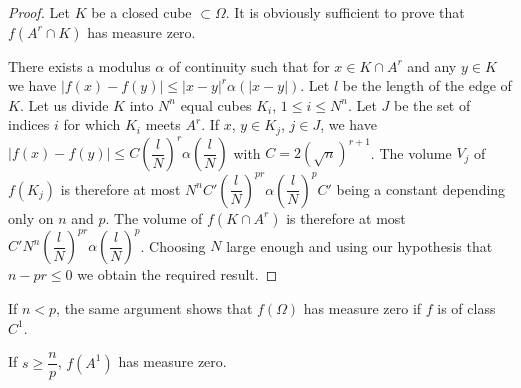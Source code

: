 \begin{proof}
Let $K$ be a closed cube $\subset \Omega$. It is obviously sufficient to prove that $f(A^{r}\cap K)$ has measure zero.

There exists a modulus $\alpha$ of continuity such that for $x\in K\cap A^{r}$ and any $y\in K$ we have $|f(x)-f(y)|\leq |x-y|^{r}\alpha(|x-y|)$. Let $l$ be the length of the edge of $K$. Let us divide $K$ into $N^{n}$ equal cubes $K_{i}$, $1\leq i\leq N^{n}$. Let $J$ be the set of indices $i$ for which $K_{i}$ meets $A^{r}$. If $x$, $y\in K_{j}$, $j\in J$, we have $|f(x)-f(y)|\leq C\left(\dfrac{l}{N}\right)^{r}\alpha\left(\dfrac{l}{N}\right)$ with $C=2(\surd n)^{r+1}$. The volume $V_{j}$ of $f(K_{j})$ is therefore at most $N^{n}C'\left(\dfrac{l}{N}\right)^{pr}\alpha \left(\dfrac{l}{N}\right)^{p}C'$ being a constant depending only on $n$ and $p$. The volume of $f(K\cap A^{r})$ is therefore at most $C'N^{n}\left(\dfrac{l}{N}\right)^{pr}\alpha\left(\dfrac{l}{N}\right)^{p}$. Choosing $N$ large enough and using our hypothesis that $n-pr\leq 0$ we obtain the required result.
\end{proof}

\begin{remark}\label{chap1-rem7.2}
If $n<p$, the same argument shows that $f(\Omega)$ has measure zero if $f$ is of class $C^{1}$.
\end{remark}

\begin{lemma}\label{chap1-lem7.3}
If $s\geq \dfrac{n}{p}$, $f(A^{1})$ has measure zero.
\end{lemma}

